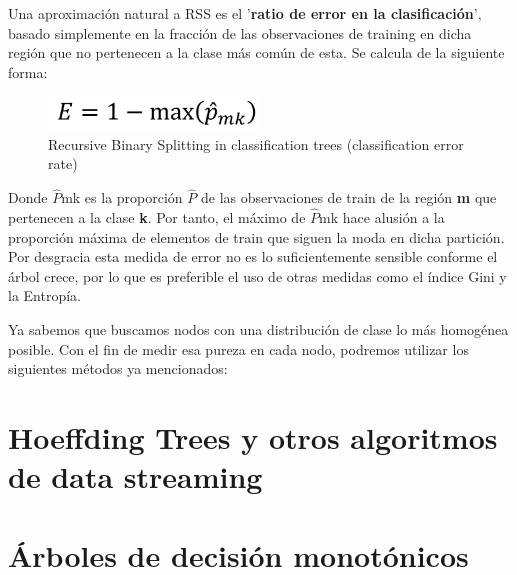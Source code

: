 Una aproximación natural a RSS es el '\textbf{ratio de error en la clasificación}', basado simplemente en la fracción de las observaciones de training en dicha región que no pertenecen a la clase más común de esta. Se calcula de la siguiente forma:

\begin{figure}[H]
	\centering
	\includegraphics[width=0.5\textwidth]{imagenes/cer} 
	\caption{Recursive Binary Splitting in classification trees (classification error rate) \cite{ref7}}
\end{figure}

Donde $\widehat{P}$mk es la proporción $\widehat{P}$ de las observaciones de train de la región \textbf{m} que pertenecen a la clase \textbf{k}. Por tanto, el máximo de $\widehat{P}$mk hace alusión a la proporción máxima de elementos de train que siguen la moda en dicha partición.\\
Por desgracia esta medida de error no es lo suficientemente sensible conforme el árbol crece, por lo que es preferible el uso de otras medidas como el índice Gini y la Entropía.

Ya sabemos que buscamos nodos con una distribución de clase lo más homogénea posible. Con el fin de medir esa pureza en cada nodo, podremos utilizar los siguientes métodos ya mencionados:


\section{Hoeffding Trees y otros algoritmos de data streaming}

\section{Árboles de decisión monotónicos}


\newpage



